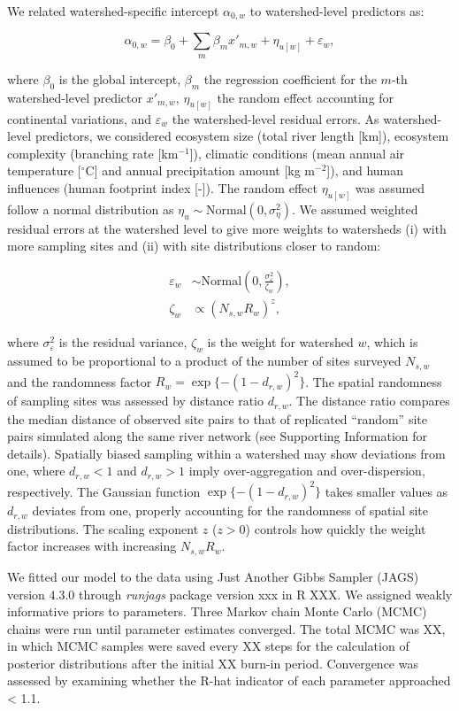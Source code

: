 \documentclass[11pt, class=article, crop=false]{standalone}
\begin{document}
We related watershed-specific intercept $\alpha_{0, w}$ to watershed-level predictors as:

\begin{equation}
    \alpha_{0, w} = \beta_0 + \sum_m \beta_m x'_{m, w} + \eta_{u[w]} + \varepsilon_{w},
\end{equation}

where $\beta_0$ is the global intercept, $\beta_m$ the regression coefficient for the $m$-th watershed-level predictor $x'_{m, w}$, $\eta_{u[w]}$ the random effect accounting for continental variations, and $\varepsilon_w$ the watershed-level residual errors.
As watershed-level predictors, we considered ecosystem size (total river length [km]), ecosystem complexity (branching rate [km$^{-1}$]), climatic conditions (mean annual air temperature [$^\circ$C] and annual precipitation amount [kg m$^{-2}$]), and human influences (human footprint index [-]).
The random effect $\eta_{u[w]}$ was assumed follow a normal distribution as $\eta_{u} \sim \mbox{Normal}(0, \sigma_{\eta}^2)$.
We assumed weighted residual errors at the watershed level to give more weights to watersheds (i) with more sampling sites and (ii) with site distributions closer to random:

\begin{align}
    \varepsilon_w &\sim \mbox{Normal}(0, \frac{\sigma_{\varepsilon}^2}{\zeta_w}),\\
    \zeta_w &\propto (N_{s, w} R_w)^{z},
\end{align}

where $\sigma_{\varepsilon}^2$ is the residual variance, $\zeta_w$ is the weight for watershed $w$, which is assumed to be proportional to a product of the number of sites surveyed $N_{s,w}$ and the randomness factor $R_w = \exp\{-(1 - d_{r,w})^2\}$.
The spatial randomness of sampling sites was assessed by distance ratio $d_{r, w}$.
The distance ratio compares the median distance of observed site pairs to that of replicated ``random'' site pairs simulated along the same river network (see Supporting Information for details).
Spatially biased sampling within a watershed may show deviations from one, where $d_{r, w} < 1$ and $d_{r, w} > 1$ imply over-aggregation and over-dispersion, respectively.
The Gaussian function $\exp\{-(1 - d_{r, w})^2\}$ takes smaller values as $d_{r, w}$ deviates from one, properly accounting for the randomness of spatial site distributions.
The scaling exponent $z$ ($z > 0$) controls how quickly the weight factor increases with increasing $N_{s, w} R_w$.

We fitted our model to the data using Just Another Gibbs Sampler (JAGS) version 4.3.0 through \textit{runjags} package version xxx in R XXX.
We assigned weakly informative priors to parameters.
Three Markov chain Monte Carlo (MCMC) chains were run until parameter estimates
converged.
The total MCMC was XX, in which MCMC samples were saved every XX steps for the calculation of posterior distributions after the initial XX burn-in period. 
Convergence was assessed by examining whether the R-hat indicator of each parameter approached < 1.1.
\end{document}
